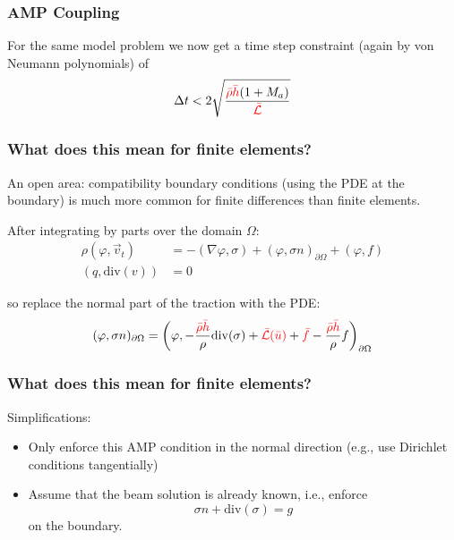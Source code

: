 \documentclass[8pt]{beamer}
\newcommand{\leftd}[1]{{\color{red} \bar{#1}}}
\newcommand{\leftdd}[2]{{\color{red} \bar{#1}(\bar{#2})}}
\newcommand{\divergence}{\mathrm{div}}
\begin{document}
\begin{frame}
    \frametitle{AMP Coupling}
    For the same model problem we now get a time step constraint (again by von
    Neumann polynomials) of
    \begin{equation}
        \Delta t < 2
        \sqrt{\dfrac{\leftd{\rho} \leftd{h} (1 + M_a)}{\leftd{\mathcal{L}}}}
    \end{equation}
\end{frame}

\begin{frame}
    \frametitle{What does this mean for finite elements?}
    An open area: compatibility boundary conditions (using the PDE at the
    boundary) is much more common for finite differences than finite elements.

    \pause
    \vspace{0.5in}
    After integrating by parts over the domain \(\Omega\):
    \begin{align}
        \rho (\varphi, \vec{v}_t) &= -(\nabla \varphi, \sigma)
        + (\varphi, \sigma n)_{\partial \Omega}
        + (\varphi, f)                                                        \\
        (q, \divergence(v)) &= 0
    \end{align}

    so replace the normal part of the traction with the PDE:
    \begin{equation}
        (\varphi, \sigma n)_{\partial \Omega} = \left(\varphi,
        - \dfrac{\leftd{\rho} \leftd{h}}{\rho} \divergence(\sigma)
        + \leftdd{\mathcal{L}}{u}
        + \leftd{f}
        - \dfrac{\leftd{\rho} \leftd{h}}{\rho} f\right)_{\partial \Omega}
    \end{equation}
\end{frame}

\begin{frame}
    \frametitle{What does this mean for finite elements?}
    Simplifications:
    \begin{itemize}
        \item Only enforce this AMP condition in the normal direction (e.g., use
              Dirichlet conditions tangentially)
        \item Assume that the beam solution is already known, i.e., enforce
              \begin{equation}
                  \sigma n + \divergence(\sigma) = g
              \end{equation}
              on the boundary.
    \end{itemize}
\end{frame}
\end{document}
